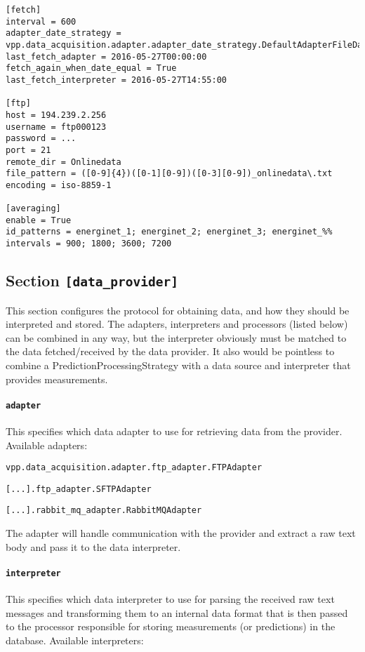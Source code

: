 {\begin{lstlisting}
[fetch]
interval = 600
adapter_date_strategy = vpp.data_acquisition.adapter.adapter_date_strategy.DefaultAdapterFileDateStrategy
last_fetch_adapter = 2016-05-27T00:00:00
fetch_again_when_date_equal = True
last_fetch_interpreter = 2016-05-27T14:55:00

[ftp]
host = 194.239.2.256
username = ftp000123
password = ...
port = 21
remote_dir = Onlinedata
file_pattern = ([0-9]{4})([0-1][0-9])([0-3][0-9])_onlinedata\.txt
encoding = iso-8859-1

[averaging]
enable = True
id_patterns = energinet_1; energinet_2; energinet_3; energinet_%%
intervals = 900; 1800; 3600; 7200
\end{lstlisting}

\subsection{Section \texttt{[data\_provider]}}
This section configures the protocol for obtaining data, and how they should be interpreted and stored. The adapters, interpreters and processors (listed below) can be combined in any way, but the interpreter obviously must be matched to the data fetched/received by the data provider. It also would be pointless to combine a PredictionProcessingStrategy with a data source and interpreter that provides measurements.

\paragraph{\texttt{adapter}} This specifies which data adapter to use for retrieving data from the provider. Available adapters:

\texttt{vpp.data\_acquisition.adapter.ftp\_adapter.FTPAdapter}

\texttt{[...].ftp\_adapter.SFTPAdapter}

\texttt{[...].rabbit\_mq\_adapter.RabbitMQAdapter}

The adapter will handle communication with the provider and extract a raw text body and pass it to the data interpreter.


\paragraph{\texttt{interpreter}} This specifies which data interpreter to use for parsing the received raw text messages and transforming them to an internal data format that is then passed to the processor responsible for storing measurements (or predictions) in the database. Available interpreters:

}
